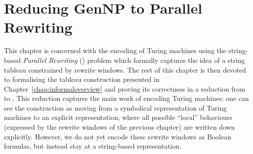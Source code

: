 \newcommand{\winw}[2]{\textsf{window}_{#1}{(#2)}}
\newcommand{\win}[1]{\textsf{window}{(#1)}}
\newcommand{\str}[1]{#1^*}
\newcommand{\prem}[1]{\textsf{prem}~#1}
\newcommand{\conc}[1]{\textsf{conc}~#1}
\newcommand{\rewHead}[3]{\textsf{rewHead}~#1~#2~#3}
\newcommand{\rewAt}[4]{\textsf{rewAt}~#1~#2~#3~#4}
\newcommand{\prefix}[2]{\textsf{prefix}~#1~#2}

\newcommand{\strentE}[1]{\rightsquigarrow_{#1}^E}
\renewcommand{\strent}[1]{\rightsquigarrow_{#1}}

\newcommand{\pFlip}[1]{\textsf{pFlip}~#1}
\newcommand{\pFlipi}[1]{\text{\textasciitilde}#1}
\newcommand{\pRev}{\textsf{pRev}}

\newcommand{\nilstr}[2]{E~#1~#2}

\newcommand{\divides}{\mid}
\newcommand{\notdivides}{\nmid}

\newcommand{\Rtape}{\ensuremath{R_{\text{tape}}}}
\newcommand{\Rtrans}{\ensuremath{R_{\text{trans}}}}
\newcommand{\Rhalt}{\ensuremath{R_{\text{halt}}}}
\newcommand{\Rsim}{\ensuremath{R_{\text{sim}}}}

\newcommand{\isSpecStateSym}[2]{\textsf{stateSym}~#1~#2}
\newcommand{\haltString}[1]{\textsf{haltingString}~#1}
\newcommand{\validCert}[1]{\textsf{validCert}~#1}
\newcommand{\validInput}[1]{\textbf{REPLACE ME}}

\newcommand{\stringForTapeHalf}{\textsf{stringForTapeHalf}}
\newcommand{\stringForConfig}{\textsf{stringForConfig}}

\newcommand{\trewwin}[6]{
  \tikzexternaldisable
  \begin{tikzpicture}
    \draw[thick] (0, 0) -- (2.25, 0);
    \draw (0.75, -0.75) -- (0.75, 0.75);
    \draw (1.5, -0.75) -- (1.5, 0.75);
    \node at (0.375, 0.375) {\ensuremath{#1}};
    \node at (0.375, -0.375) {\ensuremath{#4}};
    \node at (1.125, 0.375) {\ensuremath{#2}};
    \node at (1.125, -0.375) {\ensuremath{#5}};
    \node at (1.875, 0.375) {\ensuremath{#3}};
    \node at (1.875, -0.375) {\ensuremath{#6}};
  \end{tikzpicture}
  \tikzexternalenable
}

\newcommand*{\irewwin}[6]{\ensuremath{[#1, #2, #3]~/~[#4, #5, #6]}}
\chapter{Reducing GenNP to Parallel Rewriting}\label{chap:gennp_pr}
This chapter is concerned with the encoding of Turing machines using the string-based \emph{Parallel Rewriting} (\PR{}) problem which formally captures the idea of a string tableau constrained by rewrite windows. 
The rest of this chapter is then devoted to formalising the tableau construction presented in Chapter~\ref{chap:informaloverview} and proving its correctness in a reduction from \gennp{} to \PR{}.
This reduction captures the main work of encoding Turing machines: one can see the construction as moving from a symbolical representation of Turing machines to an explicit representation, where all possible ``local'' behaviours (expressed by the rewrite windows of the previous chapter) are written down explicitly. 
However, we do not yet encode these rewrite windows as Boolean formulas, but instead stay at a string-based representation.


